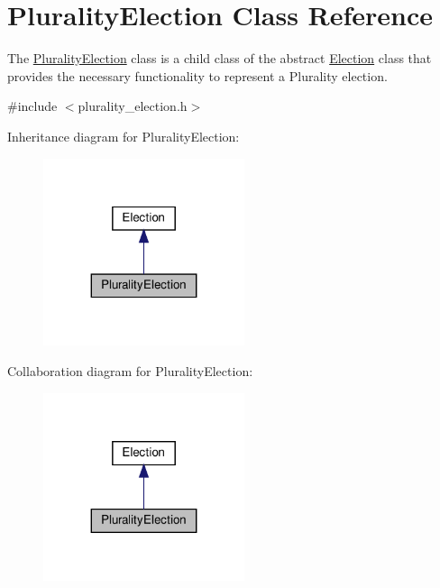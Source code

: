 \hypertarget{classPluralityElection}{}\section{Plurality\+Election Class Reference}
\label{classPluralityElection}


The \hyperlink{classPluralityElection}{Plurality\+Election} class is a child class of the abstract \hyperlink{classElection}{Election} class that provides the necessary functionality to represent a Plurality election.  




{\ttfamily \#include $<$plurality\+\_\+election.\+h$>$}



Inheritance diagram for Plurality\+Election\+:\nopagebreak
\begin{figure}[H]
\begin{center}
\leavevmode
\includegraphics[width=167pt]{classPluralityElection__inherit__graph}
\end{center}
\end{figure}


Collaboration diagram for Plurality\+Election\+:\nopagebreak
\begin{figure}[H]
\begin{center}
\leavevmode
\includegraphics[width=167pt]{classPluralityElection__coll__graph}
\end{center}
\end{figure}
